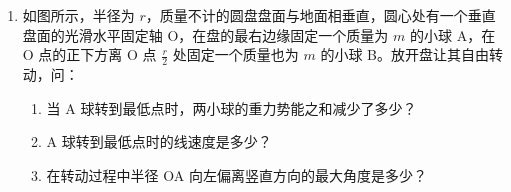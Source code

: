 \documentclass[\gkver]{gaokaozhenti}
\begin{document}
\begin{enumerate}
{$p_{0\text{左}}hS = p_{\text{左}}\cdot 2.5hS$　①

$p_{0\text{右}}hS = p_{\text{右}}\cdot 1.5hS$　②

但 $p_{0\text{左}} = p_{0\text{右}}$　③

$p_{\text{右}} - p_{\text{左}} = \rho gh$　④

由①、②、③得 $2.5p_{\text{左}}h = 1.5p_{\text{右}}h$，

④代入上式得 $2.5p_{\text{左}} = 1.5(p_{\text{左}} + \rho gh)$，

得 $p_{\text{左}} = 1.5\rho gh$。

代入①式得 $p_{0\text{左}} = p_{0\text{右}} = 2.5p_{\text{左}} = \frac{5}{2}\cdot\frac{3}{2}\rho gh = \frac{15}{4}\rho gh$。

\textbf{评分标准}：列出①、②、④各 2 分，列出③ 1 分，得出结果 3 分。
}

\item
如图所示，半径为 $r$，质量不计的圆盘盘面与地面相垂直，圆心处有一个垂直盘面的光滑水平固定轴 O，在盘的最右边缘固定一个质量为 $m$ 的小球 A，在 O 点的正下方离 O 点 $\frac{r}{2}$ 处固定一个质量也为 $m$ 的小球 B。放开盘让其自由转动，问：
\begin{enumerate}
	\item
	当 A 球转到最低点时，两小球的重力势能之和减少了多少？
	\item
	A 球转到最低点时的线速度是多少？
	\item
	在转动过程中半径 OA 向左偏离竖直方向的最大角度是多少？
\end{enumerate}
\onepicture[w=4.5cm, align=right]{}
\end{enumerate}
\end{document}
